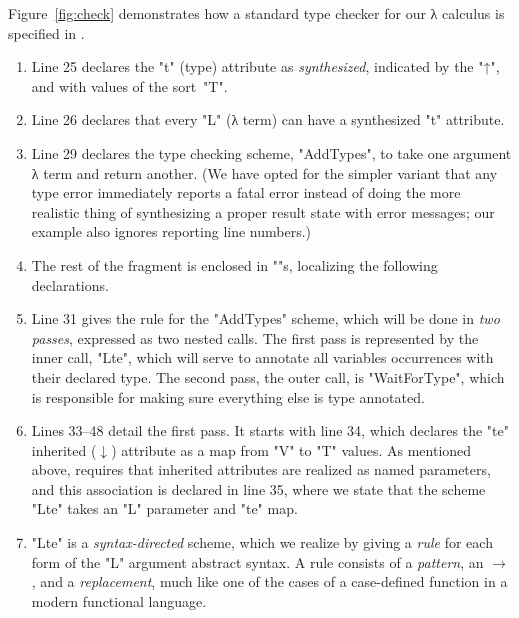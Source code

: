 \documentclass[letterpaper]{article}
\begin{document}
\begin{example}[analysis]
  Figure~\ref{fig:check} demonstrates how a standard type checker for our λ calculus is specified in
  \HAX.
  \begin{enumerate}

  \item Line 25 declares the "t" (type) attribute as \emph{synthesized}, indicated by the "↑", and
    with values of the sort~"T".

  \item Line 26 declares that every "L" (λ term) can have a synthesized "t" attribute.

  \item Line 29 declares the type checking scheme, "AddTypes", to take one argument λ term and
    return another. (We have opted for the simpler variant that any type error immediately reports a
    fatal error instead of doing the more realistic thing of synthesizing a proper result state with
    error messages; our example also ignores reporting line numbers.)

  \item The rest of the fragment is enclosed in "{}"s, localizing the following declarations.

  \item Line 31 gives the rule for the "AddTypes" scheme, which will be done in \emph{two passes},
    expressed as two nested calls. The first pass is represented by the inner call, "Lte", which
    will serve to annotate all variables occurrences with their declared type. The second pass, the
    outer call, is "WaitForType", which is responsible for making sure everything else is type
    annotated.

  \item Lines 33--48 detail the first pass. It starts with line 34, which declares the "te"
    inherited ($↓$) attribute as a map from "V" to "T" values. As mentioned above, \HAX requires
    that inherited attributes are realized as named parameters, and this association is declared in
    line 35, where we state that the scheme "Lte" takes an "L" parameter and "te" map.

  \item "Lte" is a \emph{syntax-directed} scheme, which we realize by giving a \emph{rule} for each
    form of the "L" argument abstract syntax. A rule consists of a \emph{pattern}, an $→$, and a
    \emph{replacement}, much like one of the cases of a case-defined function in a modern functional
    language.


\end{enumerate}
\end{example}
\end{document}

